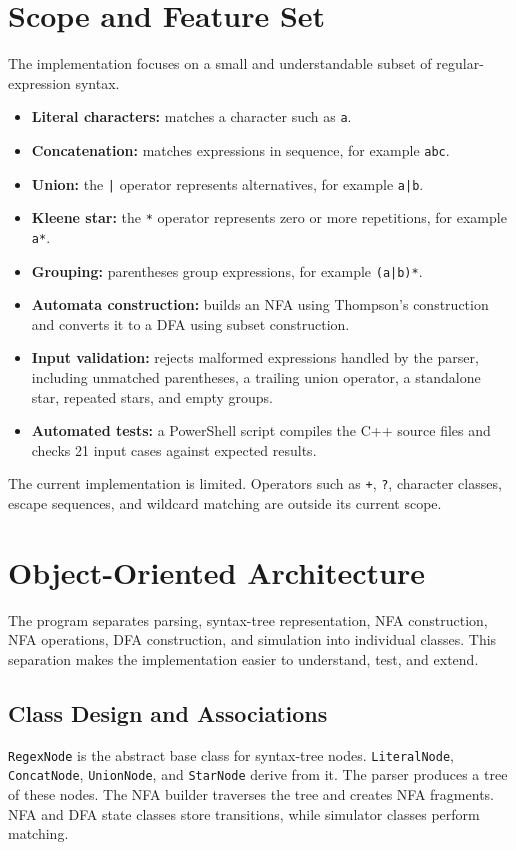 \documentclass[12pt,a4paper]{report}
\begin{document}
\section{Scope and Feature Set}
The implementation focuses on a small and understandable subset of regular-expression syntax.
\begin{itemize}
    \item \textbf{Literal characters:} matches a character such as \texttt{a}.
    \item \textbf{Concatenation:} matches expressions in sequence, for example \texttt{abc}.
    \item \textbf{Union:} the \texttt{|} operator represents alternatives, for example \texttt{a|b}.
    \item \textbf{Kleene star:} the \texttt{*} operator represents zero or more repetitions, for example \texttt{a*}.
    \item \textbf{Grouping:} parentheses group expressions, for example \texttt{(a|b)*}.
    \item \textbf{Automata construction:} builds an NFA using Thompson's construction and converts it to a DFA using subset construction.
    \item \textbf{Input validation:} rejects malformed expressions handled by the parser, including unmatched parentheses, a trailing union operator, a standalone star, repeated stars, and empty groups.
    \item \textbf{Automated tests:} a PowerShell script compiles the C++ source files and checks 21 input cases against expected results.
\end{itemize}

The current implementation is limited. Operators such as \texttt{+}, \texttt{?}, character classes, escape sequences, and wildcard matching are outside its current scope.

\section{Object-Oriented Architecture}
The program separates parsing, syntax-tree representation, NFA construction, NFA operations, DFA construction, and simulation into individual classes. This separation makes the implementation easier to understand, test, and extend.

\subsection{Class Design and Associations}
\texttt{RegexNode} is the abstract base class for syntax-tree nodes. \texttt{LiteralNode}, \texttt{ConcatNode}, \texttt{UnionNode}, and \texttt{StarNode} derive from it. The parser produces a tree of these nodes. The NFA builder traverses the tree and creates NFA fragments. NFA and DFA state classes store transitions, while simulator classes perform matching.
\end{document}
